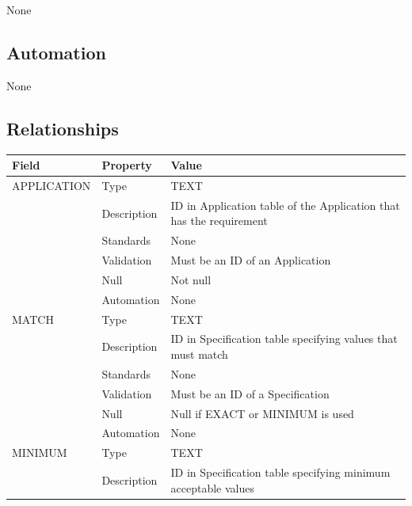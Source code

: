 None

\subsection{Automation}\label{automation-28}

None

\subsection{Relationships}\label{relationships-23}

\begin{longtable}[]{@{}
  >{\raggedright\arraybackslash}p{}
  >{\raggedright\arraybackslash}p{}
  >{\raggedright\arraybackslash}p{}@{}}
\toprule\noalign{}
\begin{minipage}[b]{\linewidth}\raggedright
Field
\end{minipage} & \begin{minipage}[b]{\linewidth}\raggedright
Property
\end{minipage} & \begin{minipage}[b]{\linewidth}\raggedright
Value
\end{minipage} \\
\midrule\noalign{}
\endhead
\bottomrule\noalign{}
\endlastfoot
APPLICATION & Type & TEXT \\
& Description & ID in Application table of the Application that has the
requirement \\
& Standards & None \\
& Validation & Must be an ID of an Application \\
& Null & Not null \\
& Automation & None \\
MATCH & Type & TEXT \\
& Description & ID in Specification table specifying values that must
match \\
& Standards & None \\
& Validation & Must be an ID of a Specification \\
& Null & Null if EXACT or MINIMUM is used \\
& Automation & None \\
MINIMUM & Type & TEXT \\
& Description & ID in Specification table specifying minimum acceptable
values \\

\end{longtable}
